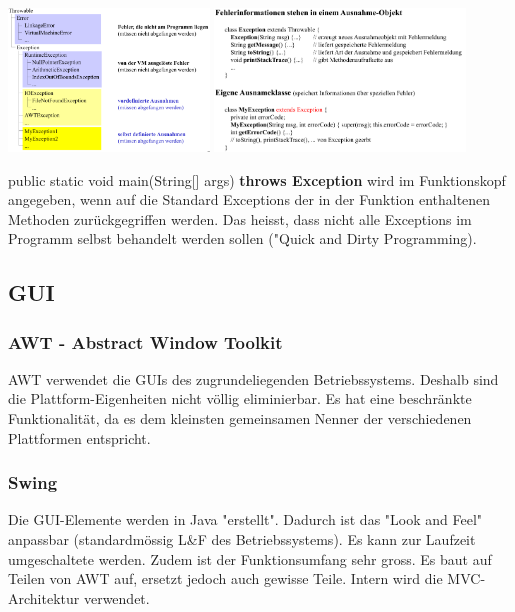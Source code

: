 

\includegraphics[width=0.40\textwidth]{Loes/Exceptions.png}
\includegraphics[width=0.50\textwidth]{Loes/Exceptions3.png}

public static void main(String[] args) \textbf{throws Exception} wird im Funktionskopf angegeben, wenn auf die Standard Exceptions der in der Funktion enthaltenen Methoden zurückgegriffen werden. Das heisst, dass nicht alle Exceptions im Programm selbst behandelt werden sollen ("Quick and Dirty Programming). 

 
                      
\subsection{GUI}
\subsubsection{AWT - Abstract Window Toolkit}
AWT verwendet die GUIs des zugrundeliegenden Betriebssystems. Deshalb sind die Plattform-Eigenheiten  nicht völlig eliminierbar. Es hat eine beschränkte Funktionalität, da es dem kleinsten gemeinsamen Nenner der verschiedenen Plattformen entspricht. 

\subsubsection{Swing}
Die GUI-Elemente werden in Java "erstellt". Dadurch ist das "Look and Feel" anpassbar (standardmössig L\&F des Betriebssystems). Es kann zur Laufzeit umgeschaltete werden. Zudem ist der Funktionsumfang sehr gross. Es baut auf Teilen von AWT auf, ersetzt jedoch auch gewisse Teile. Intern wird die MVC-Architektur verwendet. 

